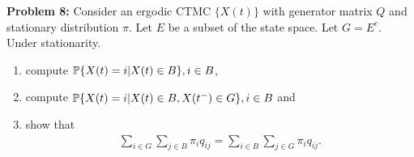 \documentclass[a4paper,11pt,english]{article}
\begin{document}
\indent \textbf{Problem 8:} Consider an ergodic CTMC $\{X(t)\}$ with generator matrix $Q$ and stationary distribution $\pi$. Let $E$ be a subset of the state space. Let $G = E^c$. Under stationarity.
\begin{enumerate}
\item compute $\P\{X(t)=i|X(t)\in B\}, i \in B$,
\item compute $\P\{X(t)=i|X(t)\in B, X(t^-) \in G \}, i \in B$ and 
\item show that 
\begin{align*}
\sum_{i\in G} \sum_{j \in B} \pi_i q_{ij} = \sum_{i \in B} \sum_{j \in G} \pi_i q_{ij}.
\end{align*}
\end{enumerate}
\end{document}
